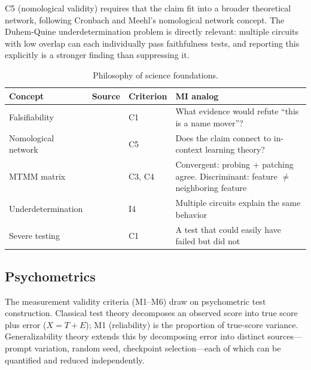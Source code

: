 \documentclass{article}
\begin{document}
C5 (nomological validity) requires that the claim fit into a broader theoretical network, following Cronbach and Meehl's nomological network concept. The Duhem-Quine underdetermination problem is directly relevant: multiple circuits with low overlap can each individually pass faithfulness tests, and reporting this explicitly is a stronger finding than suppressing it.

\begin{table}[H]
\centering\small
\caption{Philosophy of science foundations.}
\renewcommand{\arraystretch}{1.12}
\begin{tabular}{@{}l>{\raggedright\arraybackslash}p{2cm}l>{\raggedright\arraybackslash}p{4.5cm}@{}}
\toprule
\textbf{Concept} & \textbf{Source} & \textbf{Criterion} & \textbf{MI analog} \\
\midrule
Falsifiability & \citet{popper1959logic} & C1 & What evidence would refute ``this is a name mover''? \\
\midrule
Nomological network & \citet{cronbach1955construct} & C5 & Does the claim connect to in-context learning theory? \\
\midrule
MTMM matrix & \citet{campbell1959convergent} & C3, C4 & Convergent: probing + patching agree. Discriminant: feature $\neq$ neighboring feature \\
\midrule
Underdetermination & \citet{duhem1906theorie} & I4 & Multiple circuits explain the same behavior \\
\midrule
Severe testing & \citet{mayo2018statistical} & C1 & A test that could easily have failed but did not \\
\bottomrule
\end{tabular}
\end{table}

\subsection{Psychometrics}
\label{sec:psychometrics}

The measurement validity criteria (M1--M6) draw on psychometric test construction. Classical test theory decomposes an observed score into true score plus error ($X = T + E$); M1 (reliability) is the proportion of true-score variance. Generalizability theory extends this by decomposing error into distinct sources---prompt variation, random seed, checkpoint selection---each of which can be quantified and reduced independently.
\end{document}
